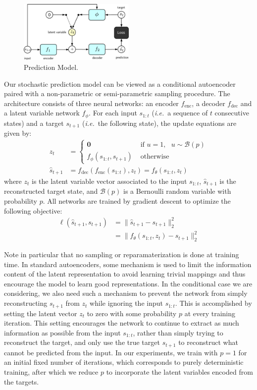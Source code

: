 \documentclass{article}
\begin{document}
\begin{figure}
  \centering
  \includegraphics[width=0.5\textwidth]{images/ae_train-crop.pdf}
  \caption{Prediction Model. }
\end{figure}

Our stochastic prediction model can be viewed as a conditional autoencoder paired with a non-parametric  or semi-parametric sampling procedure.
The architecture consists of three neural networks: an encoder $f_\text{enc}$, a decoder $f_\text{dec}$ and a latent variable network $f_\phi$.
For each input $s_{1:t}$ (\emph{i.e.}\ a sequence of $t$ consecutive states) and a target $s_{t+1}$ (\emph{i.e.}\ the following state), the update equations are given by:
%
\begin{align}
  \label{update-eqn}
  z_t &=
  \begin{cases}
    \bm{0} & \mbox{   if   } u = 1, \mbox{   } u \sim \mathcal{B}(p) \\
    f_\phi(s_{1:t}, s_{t+1}) & \mbox{   otherwise}
  \end{cases} \\
  \hat{s}_{t+1} &= f_\text{dec}(f_\text{enc}(s_{1:t}), z_t) = f_\theta(s_{1:t}, z_t)
\end{align}
%
where $z_t$ is the latent variable vector associated to the input $s_{1:t}$, $\hat{s}_{t + 1}$ is the reconstructed target state, and $\mathcal{B}(p)$ is a Bernoulli random variable with probability $p$.
All networks are trained by gradient descent to optimize the following objective:
%
\begin{align}
  \ell(\hat{s}_{t+1}, s_{t+1}) &= \lVert \hat{s}_{t+1} - s_{t+1} \rVert_2^2 \\
  &= \lVert f_\theta(s_{1:t}, z_t) - s_{t+1} \rVert_2^2
\end{align}

Note in particular that no sampling or reparamaterization is done at training time.
In standard autoencoders, some mechanism is used to limit the information content of the latent representation to avoid learning trivial mappings and thus encourage the model to learn good representations.
In the conditional case we are considering, we also need such a mechanism to prevent the network from simply reconstructing $s_{t+1}$ from $z_t$ while ignoring the input $s_{1:t}$.
This is accomplished by setting the latent vector $z_t$ to zero with some probability $p$ at every training iteration.
This setting encourages the network to continue to extract as much information as possible from the input $s_{1:t}$, rather than simply trying to reconstruct the target, and only use the true target $s_{t+1}$ to reconstruct what cannot be predicted from the input.
In our experiments, we train with $p=1$ for an initial fixed number of iterations, which corresponds to purely deterministic training, after which we reduce $p$ to incorporate the latent variables encoded from the targets.
\end{document}
